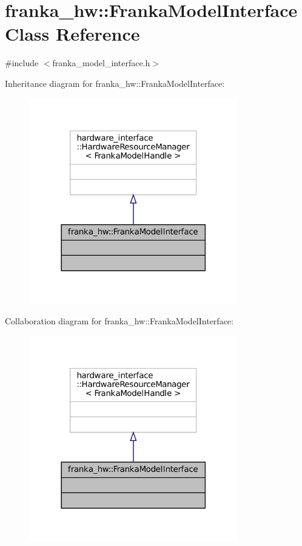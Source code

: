 \hypertarget{classfranka__hw_1_1FrankaModelInterface}{}\section{franka\+\_\+hw\+:\+:Franka\+Model\+Interface Class Reference}
\label{classfranka__hw_1_1FrankaModelInterface}


{\ttfamily \#include $<$franka\+\_\+model\+\_\+interface.\+h$>$}



Inheritance diagram for franka\+\_\+hw\+:\+:Franka\+Model\+Interface\+:
\nopagebreak
\begin{figure}[H]
\begin{center}
\leavevmode
\includegraphics[width=258pt]{classfranka__hw_1_1FrankaModelInterface__inherit__graph}
\end{center}
\end{figure}


Collaboration diagram for franka\+\_\+hw\+:\+:Franka\+Model\+Interface\+:
\nopagebreak
\begin{figure}[H]
\begin{center}
\leavevmode
\includegraphics[width=258pt]{classfranka__hw_1_1FrankaModelInterface__coll__graph}
\end{center}
\end{figure}


